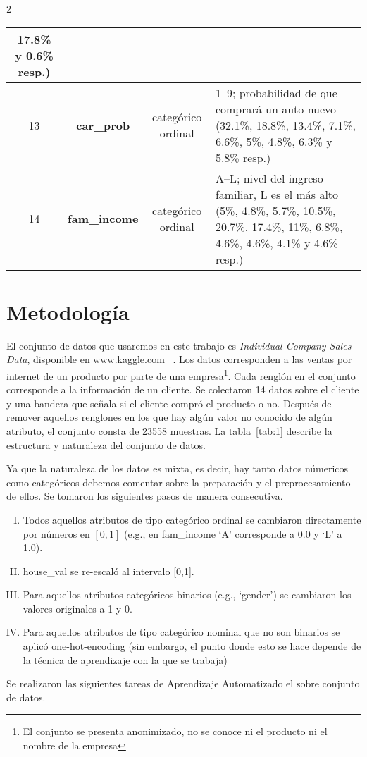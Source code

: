 \documentclass[letterpaper,11pt]{article}
\begin{document}
\begin{multicols}{2}
\begin{table*}[t]
\begin{center}
{\begin{tabular}{|c|c|c|p{10cm}|}
{    17.8\% y 0.6\% resp.)}\\
    \hline 
    13 &\bf car\_prob & categórico ordinal & 1--9; probabilidad de que comprará un auto nuevo {\footnotesize (32.1\%,
    18.8\%, 13.4\%, 7.1\%, 6.6\%, 5\%, 4.8\%, 6.3\% y 5.8\% resp.)}\\
    \hline 
    14 &\bf fam\_income & categórico ordinal & A--L; nivel del ingreso familiar, L es el más alto {\footnotesize (5\%,
    4.8\%, 5.7\%, 10.5\%, 20.7\%, 17.4\%, 11\%, 6.8\%, 4.6\%, 4.6\%, 4.1\% y 4.6\% resp.)}\\
    \hline
\end{tabular}}
\end{center}
\caption{\small La estructura de la base de datos.}
\label{tab:1}
\end{table*}

\section{Metodología}
El conjunto de datos que usaremos en este trabajo es \emph{Individual Company Sales Data}, disponible en www.kaggle.com~
\cite{kaggle}. Los datos corresponden a las ventas por internet de un producto por parte de una 
empresa\footnote{El conjunto se presenta anonimizado, no se conoce ni el producto ni el nombre de la empresa}. Cada
renglón en el conjunto corresponde a la información de un cliente.  Se colectaron 14 datos sobre el cliente y una bandera
que señala si el cliente compró el producto o no. Después de remover aquellos renglones en los que hay algún valor
no conocido de algún atributo, el conjunto consta de 23558 muestras. La tabla~\ref{tab:1} describe la estructura y 
naturaleza del conjunto de datos.

Ya que la naturaleza de los datos es mixta, es decir, hay tanto datos númericos como categóricos
debemos comentar sobre la preparación y el preprocesamiento de ellos. Se tomaron los siguientes pasos de manera
consecutiva. 

\begin{enumerate}[I.]
    \item Todos aquellos atributos de tipo categórico ordinal se cambiaron directamente por números en $[0,1]$
        (e.g., en fam\_income `A' corresponde a 0.0 y `L' a 1.0). 
    \item house\_val se re-escaló al intervalo [0,1]. 
    \item Para aquellos atributos categóricos binarios (e.g., `gender') se cambiaron los valores originales a 1 y 0. 
    \item Para aquellos atributos de tipo categórico nominal que no son binarios se aplicó one-hot-encoding (sin
        embargo, el punto donde esto se hace depende de la técnica de aprendizaje con la que se trabaja)\end{enumerate}
Se realizaron las siguientes tareas de Aprendizaje Automatizado el sobre conjunto de datos.


\end{multicols}
\end{document}
